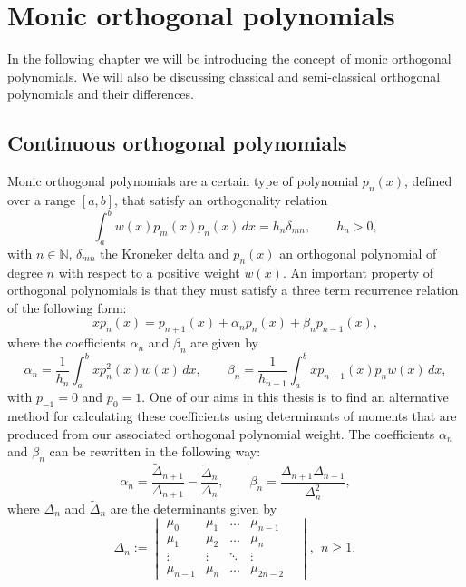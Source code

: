 \documentclass[12pt]{article}
\def\N{\mathbb{N}}
\numberwithin{figure}{section}
\numberwithin{equation}{section}
\numberwithin{table}{section}
\begin{document}
\newpage\section{Monic orthogonal polynomials}
In the following chapter we will be introducing the concept of monic orthogonal polynomials. We will also be discussing classical and semi-classical orthogonal polynomials and their differences.
\subsection{Continuous orthogonal polynomials}
Monic orthogonal polynomials are a certain type of polynomial $p_n(x)$, defined over a range $[a,b]$, that satisfy an orthogonality relation
$$\int^b_aw(x)p_m(x)p_n(x)\,dx=h_n\delta_{mn},\qquad h_n>0,$$
with $n\in\N$, $\delta_{mn}$ the Kroneker delta and $p_n(x)$ an orthogonal polynomial of degree $n$ with respect to a positive weight
$w(x)$.
An important property of orthogonal polynomials is that they must satisfy a three term recurrence relation of the following form:
\begin{equation}
xp_n(x)=p_{n+1}(x)+\alpha_{n}p_n(x)+\beta_np_{n-1}(x),\nonumber
\end{equation}
where the coefficients $\alpha_n$ and $\beta_n$ are given by
\begin{equation}\nonumber
\alpha_n=\frac{1}{h_n}\int^b_axp_n^2(x)w(x)\,dx,\qquad \beta_n=\frac{1}{h_{n-1}}\int^b_axp_{n-1}(x)p_nw(x)\,dx,
\end{equation}
with $p_{-1}=0$ and $p_{0}=1$. One of our aims in this thesis is to find an alternative method for calculating these coefficients using determinants of moments
that are
produced from our associated orthogonal polynomial weight.
The coefficients $\alpha_n$ and $\beta_n$ can be rewritten in the following way:
\begin{equation}
\alpha_n=\frac{\widetilde\Delta_{n+1}}{\Delta_{n+1}}-\frac{\widetilde\Delta_{n}}{\Delta_{n}},\qquad
\beta_n=\frac{\Delta_{n+1}\Delta_{n-1}}{\Delta_n^2}, \label{deltas}
\end{equation}
where $\Delta_n$ and $\widetilde\Delta_n$ are the determinants given by
\begin{equation}\Delta_n:=\begin{vmatrix}
\mu_{0} & \mu_1  &\hdots& \mu_{n-1} \\
\mu_1 & \mu_2  &\hdots& \mu_n  \\
\vdots  &\vdots & \ddots &\vdots & \\
\mu_{n-1} & \mu_n  &\hdots& \mu_{2n-2}
\end{vmatrix},~~n\geq1,
 \label{delta}
 \end{equation}
\end{document}
